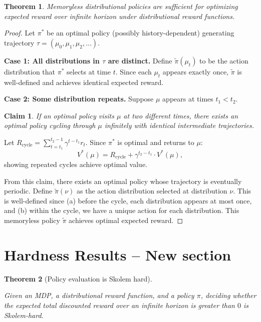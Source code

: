\documentclass{article}
\newtheorem{theorem}{Theorem}
\newtheorem{claim}{Claim}
\begin{document}
\begin{theorem}\label{thm:memoryless-sufficient}
Memoryless distributional policies are sufficient for optimizing expected reward over infinite horizon under distributional reward functions.
\end{theorem}

\begin{proof}
Let $\pi^*$ be an optimal policy (possibly history-dependent) generating trajectory $\tau = (\mu_0, \mu_1, \mu_2, \ldots)$.

\textbf{Case 1: All distributions in $\tau$ are distinct.} Define $\tilde{\pi}(\mu_t)$ to be the action distribution that $\pi^*$ selects at time $t$. Since each $\mu_t$ appears exactly once, $\tilde{\pi}$ is well-defined and achieves identical expected reward.

\textbf{Case 2: Some distribution repeats.} Suppose $\mu$ appears at times $t_1 < t_2$.

\begin{claim}
If an optimal policy visits $\mu$ at two different times, there exists an optimal policy cycling through $\mu$ infinitely with identical intermediate trajectories.
\end{claim}

Let $R_{\text{cycle}} = \sum_{t=t_1}^{t_2-1} \gamma^{t-t_1} r_t$. Since $\pi^*$ is optimal and returns to $\mu$:
\[
V^*(\mu) = R_{\text{cycle}} + \gamma^{t_2-t_1} \cdot V^*(\mu),
\]
showing repeated cycles achieve optimal value.

From this claim, there exists an optimal policy whose trajectory is eventually periodic. Define $\tilde{\pi}(\nu)$ as the action distribution selected at distribution $\nu$. This is well-defined since (a) before the cycle, each distribution appears at most once, and (b) within the cycle, we have a unique action for each distribution. This memoryless policy $\tilde{\pi}$ achieves optimal expected reward.
\end{proof}




\section{Hardness Results -- New section }
\label{sec:hardness-results}

\begin{theorem}[Policy evaluation is Skolem hard]
\label{thm:policy_evalution_hardness}


Given an MDP, a distributional reward function, and a  policy $\pi$, deciding whether the expected total discounted reward over an infinite horizon is greater than $0$ is Skolem-hard.

\end{theorem}
\end{document}
